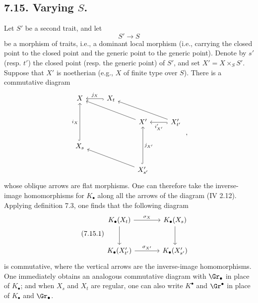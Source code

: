 %
\subsection*{7.15. Varying \(S\).}
Let \(S'\) be a second trait, and let
\[
  S'\longrightarrow S
\]
be a morphism of traits, i.e., a dominant local morphism (i.e., carrying the closed point to the closed point and the generic point to the generic point). Denote by \(s'\) (resp. \(t'\)) the closed point (resp. the generic point) of \(S'\), and set \(X'=X\times_SS'\). Suppose that \(X'\) is noetherian (e.g., \(X\) of finite type over \(S\)). There is a commutative diagram
\[
\begin{tikzcd}
X & X_t \arrow[l,hook,"j_X"'] & & \\
& & X' \arrow[ull] & X'_{t'} \arrow[l,hook,"i'_{X'}"] \arrow[ull] \\
X_s \arrow[uu,hook,"i_X"] & & & \\
& & X'_{s'} \arrow[uu,hook,"j_{X'}"'] \arrow[ull] &
\end{tikzcd}
\;,
\]
whose oblique arrows are flat morphisms. One can therefore take the inverse-image homomorphisms for \(K_\bullet\) along all the arrows of the diagram (IV 2.12). Applying definition 7.3, one finds that the following diagram
\begin{equation}\tag{7.15.1}
\begin{tikzcd}[column sep=large,row sep=large]
K_\bullet(X_t) \arrow[r,"\sigma_X"] \arrow[d] &
K_\bullet(X_s) \arrow[d]\\
K_\bullet(X'_{t'}) \arrow[r,"\sigma_{X'}"] &
K_\bullet(X'_{s'})
\end{tikzcd}
\end{equation}
is commutative, where the vertical arrows are the inverse-image homomorphisms. One immediately obtains an analogous commutative diagram with \(\Gr_\bullet\) in place of \(K_\bullet\); and when \(X_s\) and \(X_t\) are regular, one can also write \(K^\bullet\) and \(\Gr^\bullet\) in place of \(K_\bullet\) and \(\Gr_\bullet\).


